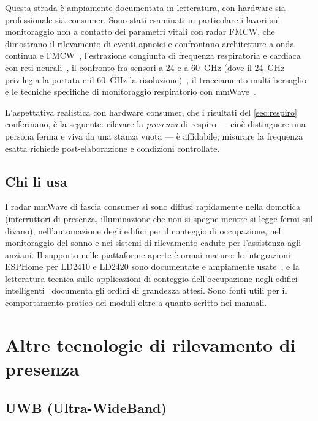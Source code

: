 Questa strada è ampiamente documentata in letteratura, con hardware sia
professionale sia consumer. Sono stati esaminati in particolare i lavori
sul monitoraggio non a contatto dei parametri vitali con radar FMCW, che
dimostrano il rilevamento di eventi apnoici e confrontano architetture a onda
continua e FMCW~\cite{upm2024vitals}, l'estrazione congiunta di frequenza
respiratoria e cardiaca con reti neurali~\cite{uts2024vitals}, il confronto fra
sensori a 24 e a 60~GHz (dove il 24~GHz privilegia la portata e il 60~GHz la
risoluzione)~\cite{theseus2024}, il tracciamento multi-bersaglio~\cite{uts2023mot}
e le tecniche specifiche di monitoraggio respiratorio con
mmWave~\cite{mdpi2024mmwaverm}.

L'aspettativa realistica con hardware consumer, che i risultati del
\cref{sec:respiro} confermano, è la seguente: rilevare la \emph{presenza} di
respiro --- cioè distinguere una persona ferma e viva da una stanza vuota --- è
affidabile; misurare la frequenza esatta richiede post-elaborazione e condizioni
controllate.

\subsection{Chi li usa}

I radar mmWave di fascia consumer si sono diffusi rapidamente nella domotica
(interruttori di presenza, illuminazione che non si spegne mentre si legge fermi
sul divano), nell'automazione degli edifici per il conteggio di occupazione, nel
monitoraggio del sonno e nei sistemi di rilevamento cadute per l'assistenza agli
anziani. Il supporto nelle piattaforme aperte è ormai maturo: le integrazioni
ESPHome per LD2410 e LD2420 sono documentate e ampiamente
usate~\cite{esphomeLD2410,esphomeLD2420,espboards}, e la letteratura tecnica sulle
applicazioni di conteggio dell'occupazione negli edifici
intelligenti~\cite{mmwaveOccupancy} documenta gli ordini di grandezza attesi. Sono
fonti utili per il
comportamento pratico dei moduli oltre a quanto scritto nei manuali.

\section{Altre tecnologie di rilevamento di presenza}
\label{sec:altre-tecnologie}

\subsection{UWB (Ultra-WideBand)}
\label{sec:uwb}

